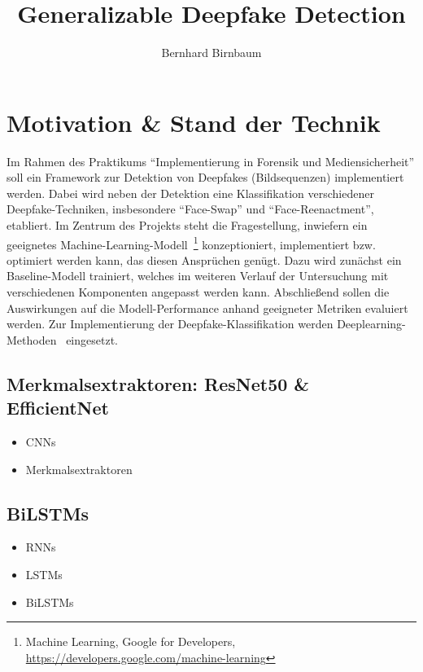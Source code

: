 \documentclass{article}
\title{Generalizable Deepfake Detection}
\author{Bernhard Birnbaum}
\begin{document}
    \maketitle

    \section{Motivation \& Stand der Technik}
    Im Rahmen des Praktikums \enquote{Implementierung in Forensik und Mediensicherheit} soll ein Framework zur Detektion von Deepfakes (Bildsequenzen) implementiert werden.
    Dabei wird neben der Detektion eine Klassifikation verschiedener Deepfake-Techniken, insbesondere \enquote{Face-Swap} und \enquote{Face-Reenactment}, etabliert.
    Im Zentrum des Projekts steht die Fragestellung, inwiefern ein geeignetes Machine-Learning-Modell~\footnote{Machine Learning, Google for Developers, \url{https://developers.google.com/machine-learning}} konzeptioniert, implementiert bzw. optimiert werden kann, das diesen Ansprüchen genügt.
    Dazu wird zunächst ein Baseline-Modell trainiert, welches im weiteren Verlauf der Untersuchung mit verschiedenen Komponenten angepasst werden kann.
    Abschließend sollen die Auswirkungen auf die Modell-Performance anhand geeigneter Metriken evaluiert werden.
    Zur Implementierung der Deepfake-Klassifikation werden Deeplearning-Methoden~\cite{deeplearningbook} eingesetzt.
    \subsection{Merkmalsextraktoren: ResNet50 \& EfficientNet}
    \begin{itemize}
        \item CNNs
        \item Merkmalsextraktoren %
    \end{itemize}
    \subsection{BiLSTMs}
    \begin{itemize}
        \item RNNs
        \item LSTMs
        \item BiLSTMs %
    \end{itemize}
\end{document}
